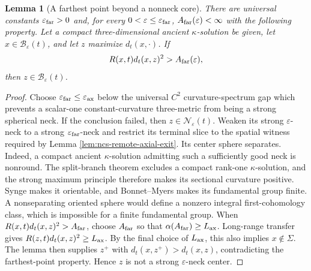 \documentclass[10pt]{coll-l}
\newtheorem{lemma}[theorem]{Lemma}
\theoremstyle{definition}
\theoremstyle{remark}
\numberwithin{section}{chapter}
\numberwithin{equation}{chapter}
\begin{document}
\begin{lemma}[A farthest point beyond a nonneck core]
\label{lem:ncs-farthest-point-nonneck}
There are universal constants $\varepsilon_{\rm far}>0$ and, for every
$0<\varepsilon\leq\varepsilon_{\rm far}$, $A_{\rm far}(\varepsilon)<\infty$
with the following property.  Let a compact three-dimensional ancient
$\kappa$-solution be given, let
$x\in\mathscr B_\varepsilon(t)$, and let $z$ maximize $d_t(x,\cdot)$.  If
\begin{equation}
             R(x,t)d_t(x,z)^2>A_{\rm far}(\varepsilon),       \label{eq:ncs-farthest-remote}
\end{equation}
then $z\in\mathscr B_\varepsilon(t)$.
\end{lemma}

\begin{proof}
Choose $\varepsilon_{\rm far}\leq\varepsilon_{\rm ax}$ below the universal
$C^2$ curvature-spectrum gap which prevents a scalar-one
constant-curvature three-metric from being a strong spherical neck.  If the conclusion
failed, then $z\in\mathscr N_\varepsilon(t)$.  Weaken its strong
$\varepsilon$-neck to a strong $\varepsilon_{\rm far}$-neck and restrict
its terminal slice to the spatial witness required by Lemma
\ref{lem:ncs-remote-axial-exit}.  Its center sphere separates.  Indeed, a
compact ancient $\kappa$-solution admitting such a sufficiently good neck
is nonround.  The split-branch theorem excludes a compact rank-one
$\kappa$-solution, and the strong maximum principle therefore makes its
sectional curvature positive.  Synge makes it orientable, and Bonnet--Myers makes its
fundamental group finite.  A nonseparating oriented sphere would define a
nonzero integral first-cohomology class, which is impossible for a finite
fundamental group.  When
$R(x,t)d_t(x,z)^2>A_{\rm far}$, choose
$A_{\rm far}$ so that
$\alpha(A_{\rm far})\geq L_{\rm ax}$.  Long-range transfer gives
$R(z,t)d_t(x,z)^2\geq L_{\rm ax}$.  By the final choice of
$L_{\rm ax}$, this also implies $x\notin\Sigma$.  The lemma then supplies
$z^+$ with $d_t(x,z^+)>d_t(x,z)$, contradicting the farthest-point
property.  Hence $z$ is not a strong $\varepsilon$-neck center.
\end{proof}
\end{document}
